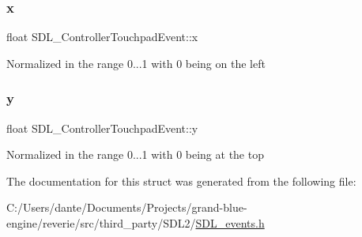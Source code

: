 \subsubsection{\texorpdfstring{x}{x}}
{\footnotesize\ttfamily float S\+D\+L\+\_\+\+Controller\+Touchpad\+Event\+::x}

Normalized in the range 0...1 with 0 being on the left \mbox{\label{struct_s_d_l___controller_touchpad_event_a7d7bb07fbb017e8d832f04a0bb80c333}} 
\subsubsection{\texorpdfstring{y}{y}}
{\footnotesize\ttfamily float S\+D\+L\+\_\+\+Controller\+Touchpad\+Event\+::y}

Normalized in the range 0...1 with 0 being at the top 

The documentation for this struct was generated from the following file\+:\begin{DoxyCompactItemize}
\item 
C\+:/\+Users/dante/\+Documents/\+Projects/grand-\/blue-\/engine/reverie/src/third\+\_\+party/\+S\+D\+L2/\mbox{\hyperlink{_s_d_l__events_8h}{S\+D\+L\+\_\+events.\+h}}\end{DoxyCompactItemize}
